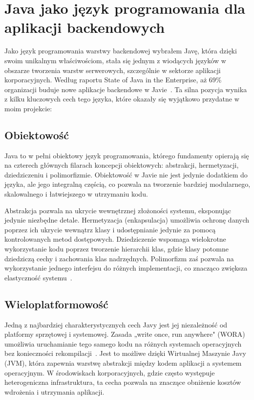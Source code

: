 \documentclass[a4paper,12pt,openany]{book}
\begin{document}
\section{Java jako język programowania dla aplikacji backendowych}

Jako język programowania warstwy backendowej wybrałem Javę, która dzięki swoim unikalnym właściwościom, stała się jednym z wiodących języków w obszarze tworzenia warstw serwerowych, szczególnie w sektorze aplikacji korporacyjnych. Według raportu State of Java in the Enterprise, aż 69\% organizacji buduje nowe aplikacje backendowe w Javie~\cite{bib:vaadin2023}. Ta silna pozycja wynika z kilku kluczowych cech tego języka, które okazały się wyjątkowo przydatne w moim projekcie:

\subsection*{Obiektowość}

Java to w pełni obiektowy język programowania, którego fundamenty opierają się na czterech głównych filarach koncepcji obiektowych: abstrakcji, hermetyzacji, dziedziczeniu i polimorfizmie. Obiektowość w Javie nie jest jedynie dodatkiem do języka, ale jego integralną częścią, co pozwala na tworzenie bardziej modularnego, skalowalnego i łatwiejszego w utrzymaniu kodu.

Abstrakcja pozwala na ukrycie wewnętrznej złożoności systemu, eksponując jedynie niezbędne detale. Hermetyzacja (enkapsulacja) umożliwia ochronę danych poprzez ich ukrycie wewnątrz klasy i udostępnianie jedynie za pomocą kontrolowanych metod dostępowych. Dziedziczenie wspomaga wielokrotne wykorzystanie kodu poprzez tworzenie hierarchii klas, gdzie klasy potomne dziedziczą cechy i zachowania klas nadrzędnych. Polimorfizm zaś pozwala na wykorzystanie jednego interfejsu do różnych implementacji, co znacząco zwiększa elastyczność systemu~\cite{bib:geeksforgeeks2023oop}.

\subsection*{Wieloplatformowość}

Jedną z najbardziej charakterystycznych cech Javy jest jej niezależność od platformy sprzętowej i systemowej. Zasada „write once, run anywhere" (WORA) umożliwia uruchamianie tego samego kodu na różnych systemach operacyjnych bez konieczności rekompilacji~\cite{bib:geeksforgeeks2023wora}. Jest to możliwe dzięki Wirtualnej Maszynie Javy (JVM), która zapewnia warstwę abstrakcji między kodem aplikacji a systemem operacyjnym. W środowiskach korporacyjnych, gdzie często występuje heterogeniczna infrastruktura, ta cecha pozwala na znaczące obniżenie kosztów wdrożenia i utrzymania aplikacji.
\end{document}
